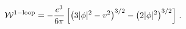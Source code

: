 \begin{equation}
{\cal W}^{\rm 1-loop} = -\frac{e^3}{6\pi} \left[ \left( 3|\phi |^2
-v^2 \right)^{3/2} -\left( 2|\phi |^2 \right)^{3/2} \right]
\,.\label{W1loop}
\end{equation}

